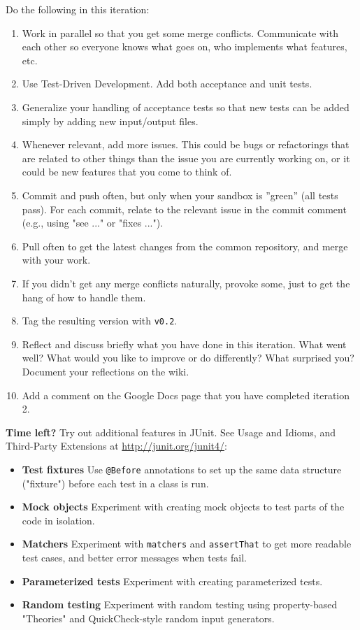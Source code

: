 \documentclass[swedish,english]{article}
\begin{document}
Do the following in this iteration:

\begin{enumerate}
\item Work in parallel so that you get some merge conflicts. Communicate with each other so everyone knows what goes on, who implements what features, etc.
\item Use Test-Driven Development. Add both acceptance and unit tests.
\item Generalize your handling of acceptance tests so that new tests can be added simply by adding new input/output files.
\item Whenever relevant, add more issues. This could be bugs or refactorings that are related to other things than the issue you are currently working on, or it could be new features that you come to think of. 
\item Commit and push often, but only when your sandbox is ''green'' (all tests pass). For each commit, relate to the relevant issue in the commit comment (e.g., using "see ..." or "fixes ...").
\item Pull often to get the latest changes from the common repository, and merge with your work.
\item If you didn't get any merge conflicts naturally, provoke some, just to get the hang of how to handle them.
\item Tag the resulting version with \verb'v0.2'.
\item Reflect and discuss briefly what you have done in this iteration. What went well? What would you like to improve or do differently? What surprised you? Document your reflections on the wiki.
\item Add a comment on the Google Docs page that you have completed iteration 2.
\end{enumerate}

\textbf{Time left?} Try out additional features in JUnit. See Usage and Idioms, and Third-Party Extensions at \url{http://junit.org/junit4/}:
\begin{itemize}
\item \textbf{Test fixtures} Use  \verb'@Before' annotations to set up the same data structure ("fixture") before each test in a class is run.
\item \textbf{Mock objects} Experiment with creating mock objects to test parts of the code in isolation.
\item \textbf{Matchers} Experiment with \verb'matchers' and \verb'assertThat' to get more readable test cases, and better error messages when tests fail.
\item \textbf{Parameterized tests} Experiment with creating parameterized tests.
\item \textbf{Random testing} Experiment with random testing using property-based "Theories" and QuickCheck-style random input generators.

\end{itemize}
\end{document}
